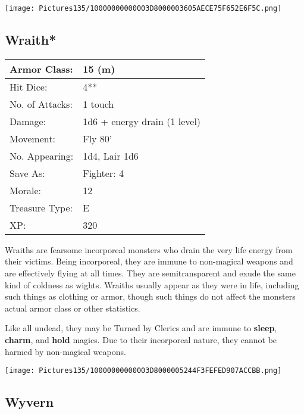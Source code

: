 \documentclass[a4paper,twoside,openany,10pt]{book}
\begin{document}
\begin{multicols}{2}
\begin{center} \texttt{[image: Pictures135/10000000000003D8000003605AECE75F652E6F5C.png]} \end{center}


\subsection*{Wraith*}\label{wraith}

\begin{tabularx}{0.50\textwidth}{@{}lX@{}}
Armor Class: & 15 (m) \\\hline
Hit Dice: & 4** \\\hline
No. of Attacks: & 1 touch \\\hline
Damage: & 1d6 + energy drain (1 level) \\\hline
Movement: & Fly 80' \\\hline
No. Appearing: & 1d4, Lair 1d6 \\\hline
Save As: & Fighter: 4 \\\hline
Morale: & 12 \\\hline
Treasure Type: & E \\\hline
XP: & 320 \\\hline
\end{tabularx}\medskip

Wraiths are fearsome incorporeal monsters who drain the very life energy from their victims. Being incorporeal, they are immune to non-magical weapons and are effectively flying at all times. They are semitransparent and exude the same kind of coldness as wights. Wraiths usually appear as they were in life, including such things as clothing or armor, though such things do not affect the monsters actual armor class or other statistics.

Like all undead, they may be Turned by Clerics and are immune to \textbf{sleep}, \textbf{charm},\textbf{ }and \textbf{hold} magics. Due to their incorporeal nature, they cannot be harmed by non-magical weapons.

\begin{center} \texttt{[image: Pictures135/10000000000003D8000005244F3FEFED907ACCBB.png]} \end{center}

\subsection*{Wyvern}\label{wyvern}


\end{multicols}
\end{document}
